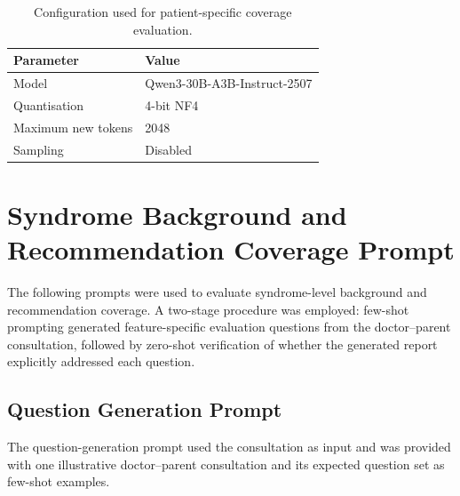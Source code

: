 \documentclass[ %
                    author={Aman Kumar Singh},
                supervisor={Dr. Edwin Simpson},
                    degree={MSc},
                     title={Quality-Aware Knowledge Distillation of Large Language Models for Efficient Personalised Clinical Report Generation},
                  subtitle={},
                      type={},
                      year={2021}]{dissertation}
\begin{document}
\begin{table}[htbp]
\centering
\caption{Configuration used for patient-specific coverage evaluation.}
\label{tab:patient_coverage_config}
\begin{tabular}{ll}
\hline
\textbf{Parameter} & \textbf{Value} \\
\hline
Model & Qwen3-30B-A3B-Instruct-2507 \\
Quantisation & 4-bit NF4 \\
Maximum new tokens & 2048 \\
Sampling & Disabled \\

\hline
\end{tabular}
\end{table}

\chapter{Syndrome Background and Recommendation Coverage Prompt}
\label{appx:syndrome_coverage_prompt}

The following prompts were used to evaluate syndrome-level background and
recommendation coverage. A two-stage procedure was employed: few-shot
prompting generated feature-specific evaluation questions from the
doctor--parent consultation, followed by zero-shot verification of whether
the generated report explicitly addressed each question.


\section*{Question Generation Prompt}

The question-generation prompt used the consultation as input and was
provided with one illustrative doctor--parent consultation and its expected
question set as few-shot examples.
\end{document}
